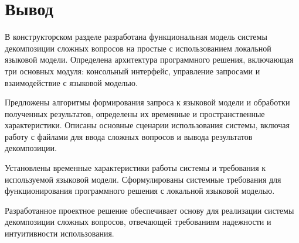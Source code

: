 \section{Вывод}

В конструкторском разделе разработана функциональная модель системы декомпозиции сложных вопросов на простые с использованием локальной языковой модели. Определена архитектура программного решения, включающая три основных модуля: консольный интерфейс, управление запросами и взаимодействие с языковой моделью.

Предложены алгоритмы формирования запроса к языковой модели и обработки полученных результатов, определены их временные и пространственные характеристики. Описаны основные сценарии использования системы, включая работу с файлами для ввода сложных вопросов и вывода результатов декомпозиции.

Установлены временные характеристики работы системы и требования к используемой языковой модели. Сформулированы системные требования для функционирования программного решения с локальной языковой моделью.

Разработанное проектное решение обеспечивает основу для реализации системы декомпозиции сложных вопросов, отвечающей требованиям надежности и интуитивности использования.